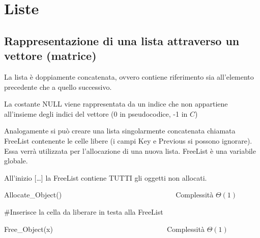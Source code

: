 \chapter{Liste}

\section{Rappresentazione di una lista attraverso un vettore (matrice)}

{La lista è doppiamente concatenata, ovvero contiene riferimento sia all'elemento precedente che a quello successivo.}

{La costante NULL viene rappresentata da un indice che non appartiene all'insieme degli indici del vettore (0 in pseudocodice, -1 in $C$)}



{Analogamente si può creare una lista singolarmente concatenata chiamata FreeList contenente le celle libere (i campi Key e Previous si possono ignorare). Essa verrà utilizzata per l'allocazione di una nuova lista. FreeList è una variabile globale.}

{All'inizio {[}\ldots{}{]} la FreeList contiene TUTTI gli oggetti non allocati.}

{Allocate\_Object()~~~~~~~~~~~~~~~~~~~~~~~~~~~~~~~~}{Complessità $\Theta(1)$}



{\#Inserisce la cella da liberare in testa alla FreeList}

{Free\_Object(x)}{~~~~~~~~~~~~~~~~~~~~~~~~~~~~~~~~Complessità $\Theta(1)$}


